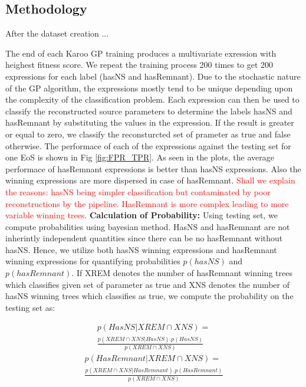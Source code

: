 \subsection{Methodology}

After the dataset creation ...

The end of each Karoo GP training produces a multivariate exression with heighest fitness score. We repeat the training process 200 times to get 200 expressions for each label (hasNS and hasRemnant). Due to the stochastic nature of the GP algorithm, the expressions mostly tend to be unique depending upon the complexity of the classification problem. Each expression can then be used to classify the reconstructed source parameters to determine the labels hasNS and hasRemnant by substituting the values in the expression. If the result is greater or equal to zero, we classify the reconsturcted set of prameter as true and false otherwise. The performace of each of the expressions against the testing set for one EoS is shown in Fig \ref{fig:FPR_TPR}. As seen in the plots, the average performace of hasRemnant expressions is better than hasNS expressions. Also the winning expressions are more dispersed in case of hasRemnant.  \textcolor{red}{Shall we explain the reasons: hasNS being simpler classification but contaminated by poor reconstructions by the pipeline. HasRemnant is more complex leading to more variable winning trees.} 
\linebreak
\textbf{Calculation of Probability:} Using testing set, we compute probabilities using bayesian method. HasNS and hasRemnant are not inherintly independent quantities since there can be no hasRemnant without hasNS. Hence, we utilize both hasNS winning expressions and hasRemnant winning expressions for quantifying probabilities $p(hasNS)$ and $p(hasRemnant)$. If XREM denotes the number of hasRemnant winning trees which classifies given set of parameter as true and XNS denotes the number of hasNS winning trees which classifies as true, we compute the probability on the testing set as:    

\begin{equation}
\begin{split}
p(HasNS| XREM \cap XNS) =\\ 
\frac{p(XREM \cap XNS|HasNS).p(HasNS)}{p(XREM \cap XNS)}
\end{split}
\end{equation}
\begin{equation}
\begin{split}
p(HasRemnant| XREM \cap XNS) =\\ 
\frac{p(XREM \cap XNS|HasRemnant).p(HasRemnant)}{p(XREM \cap XNS)}
\end{split}
\end{equation}


